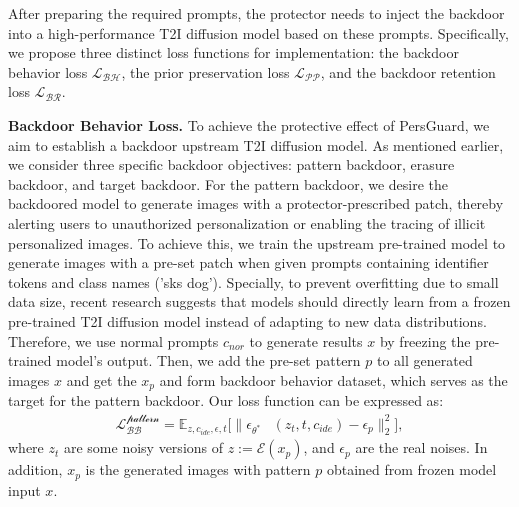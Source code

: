 After preparing the required prompts, the protector needs to inject the backdoor into a high-performance T2I diffusion model based on these prompts. Specifically, we propose three distinct loss functions for implementation: the backdoor behavior loss $\mathcal{L_{BH}}$, the prior preservation loss $\mathcal{L_{PP}}$, and the backdoor retention loss $\mathcal{L_{BR}}$.

\noindent \textbf{Backdoor Behavior Loss.} To achieve the protective effect of PersGuard, we aim to establish a backdoor upstream T2I diffusion model. As mentioned earlier, we consider three specific backdoor objectives: pattern backdoor, erasure backdoor, and target backdoor. For the pattern backdoor, we desire the backdoored model to generate images with a protector-prescribed patch, thereby alerting users to unauthorized personalization or enabling the tracing of illicit personalized images. To achieve this, we train the upstream pre-trained model to generate images with a pre-set patch when given prompts containing identifier tokens and class names ('sks dog'). Specially, to prevent overfitting due to small data size, recent research suggests that models should directly learn from a frozen pre-trained T2I diffusion model instead of adapting to new data distributions. Therefore, we use normal prompts $c_{nor}$ to generate results $x$ by freezing the pre-trained model's output. Then, we add the pre-set pattern $p$ to all generated images $x$ and get the $x_p$ and form backdoor behavior dataset, which serves as the target for the pattern backdoor. Our loss function can be expressed as:
\begin{equation}
   \begin{aligned}
   \mathcal{L_{BB}^\text{pattern}} = \mathbb{E}_{z, c_{ide}, \epsilon, t} \Big[\Big\| \epsilon_{\theta^{*}}&\left(z_{t},t, c_{ide}\right) - \epsilon_p\Big\|_2^2 \Big],
   \end{aligned}
\end{equation}
where $z_t$ are some noisy versions of $z := \mathcal{E}(x_p)$, and $\epsilon_p$ are the real noises. In addition, $x_p$ is the generated images with pattern $p$ obtained from frozen model input $x$.


